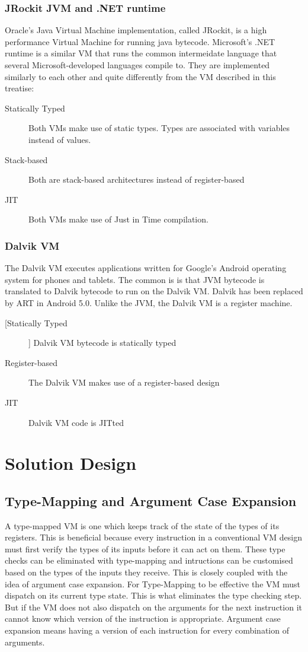 \documentclass[english,a4paper]{article}
\begin{document}
\subsubsection{JRockit JVM and .NET runtime}
Oracle's Java Virtual Machine implementation, called JRockit, is a
high performance Virtual Machine for running java
bytecode. Microsoft's .NET runtime is a similar VM that runs the
common intermeidate language that several Microsoft-developed
languages compile to. They are implemented similarly to each other and
quite differently from the VM described in this treatise:
\begin{description}
\item[Statically Typed] Both VMs make use of static types. Types are
  associated with variables instead of values.
\item[Stack-based] Both are stack-based architectures instead of
  register-based
\item[JIT] Both VMs make use of Just in Time compilation.
\end{description}

\subsubsection{Dalvik VM}
The Dalvik VM executes applications written for Google's Android
operating system for phones and tablets. The common is is that JVM
bytecode is translated to Dalvik bytecode to run on the Dalvik
VM. Dalvik has been replaced by ART in Android 5.0. Unlike the JVM,
the Dalvik VM is a register machine.
\begin{description}
\item[[Statically Typed]] Dalvik VM bytecode is statically typed
\item[Register-based] The Dalvik VM makes use of a register-based
  design
\item[JIT] Dalvik VM code is JITted
\end{description}

\section{Solution Design}

\subsection{Type-Mapping and Argument Case Expansion}

A type-mapped VM is one which keeps track of the state of the types of
its registers. This is beneficial because every instruction in a
conventional VM design must first verify the types of its inputs
before it can act on them. These type checks can be eliminated with
type-mapping and intructions can be customised based on the types of
the inputs they receive. This is closely coupled with the idea of
argument case expansion. For Type-Mapping to be effective the VM must
dispatch on its current type state. This is what eliminates the type
checking step. But if the VM does not also dispatch on the arguments
for the next instruction it cannot know which version of the
instruction is appropriate. Argument case expansion means having a
version of each instruction for every combination of arguments.
\end{document}
